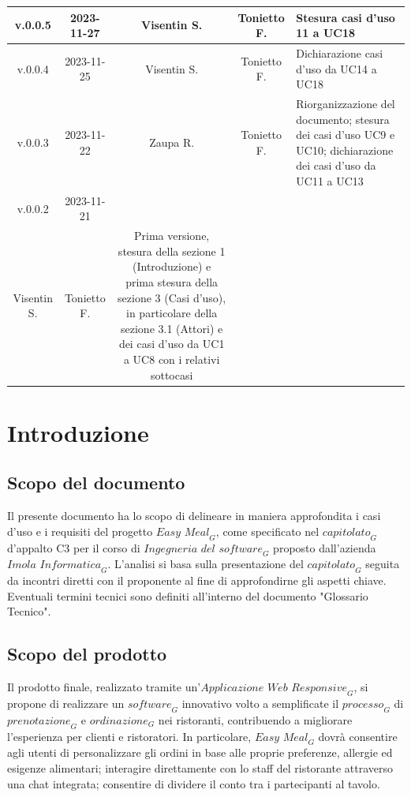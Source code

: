 \documentclass[12pt, oneside]{article}
\begin{document}
\begin{longtable}{|c|c|c|c|p{7cm}|}
\hline
v.0.0.5 & 2023-11-27 & Visentin S. & Tonietto F. & Stesura casi d'uso 11 a UC18 \\
\hline
v.0.0.4 & 2023-11-25 & Visentin S. & Tonietto F. & Dichiarazione casi d'uso da UC14 a UC18 \\
\hline
v.0.0.3 & 2023-11-22 & Zaupa R. & Tonietto F. & Riorganizzazione del documento; stesura dei casi d'uso UC9 e UC10; dichiarazione dei casi d'uso da UC11 a UC13 \\
\hline
v.0.0.2 & 2023-11-21 & 
  \begin{tabular}[c]{@{}c@{}}
    Zaupa R. \\
    Visentin S.
  \end{tabular} 
  & Tonietto F. & Prima versione, stesura della sezione 1 (Introduzione) e prima stesura della sezione 3 (Casi d'uso), in particolare della sezione 3.1 (Attori) e dei casi d'uso da UC1 a UC8 con i relativi sottocasi\\
\hline
\end{longtable}
\newpage

\tableofcontents
\newpage

\section{Introduzione}
\subsection{Scopo del documento}
Il presente documento ha lo scopo di delineare in maniera approfondita i casi d'uso e i requisiti del progetto $\textit{Easy Meal}_G$, come specificato nel $\textit{capitolato}_G$ d'appalto C3 per il corso di $\textit{Ingegneria del software}_G$ proposto dall'azienda $\textit{Imola Informatica}_G$.
L'analisi si basa sulla presentazione del $\textit{capitolato}_G$ seguita da incontri diretti con il proponente al fine di approfondirne gli aspetti chiave. Eventuali termini tecnici sono definiti all'interno del documento "Glossario Tecnico".
\subsection{Scopo del prodotto}
Il prodotto finale, realizzato tramite un'$\textit{Applicazione Web Responsive}_G$, si propone di realizzare un $\textit{software}_G$ innovativo volto a semplificate il $\textit{processo}_G$ di $\textit{prenotazione}_G$ e $\textit{ordinazione}_G$ nei ristoranti, contribuendo a migliorare l'esperienza per clienti e ristoratori. In particolare, $\textit{Easy Meal}_G$ dovrà consentire agli utenti di personalizzare gli ordini in base alle proprie preferenze, allergie ed esigenze alimentari; interagire direttamente con lo staff del ristorante attraverso una chat integrata; consentire di dividere il conto tra i partecipanti al tavolo.
\end{document}
